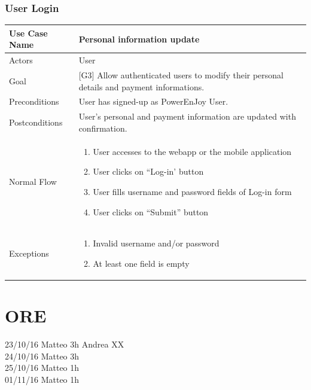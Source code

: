 \documentclass[english]{article}
\providecommand{\tabularnewline}{\\}
\begin{document}
\subsubsection{User Login}
\begin{center}
	\begin{tabular}{|l|>{\raggedright}p{10cm}|}
		\hline 
		Use Case Name & Personal information update\tabularnewline
		\hline 
		\hline 
		Actors & User\tabularnewline
		\hline 
		Goal & {[}G3{]} Allow authenticated users to modify their personal details and payment informations.\tabularnewline
		\hline 
		Preconditions & User has signed-up as PowerEnJoy User.\tabularnewline
		\hline 
		Postconditions & User's personal and payment information are updated with confirmation.\tabularnewline
		\hline 
		Normal Flow & \begin{enumerate}
			\item User accesses to the webapp or the mobile application
			\item User clicks on ``Log-in' button
			\item User fills username and password fields of Log-in form
			\item User clicks on ``Submit'' button
		\end{enumerate}
		\tabularnewline
		\hline 
		Exceptions & \begin{enumerate}
			\item Invalid username and/or password
			\item At least one field is empty\end{enumerate}
		\tabularnewline
		\hline 
	\end{tabular}
	\par\end{center}

\section{ORE}
23/10/16 
Matteo 3h 
Andrea XX\\
24/10/16 
Matteo 3h\\
25/10/16 
Matteo 1h\\
01/11/16
Matteo 1h\\
\end{document}
